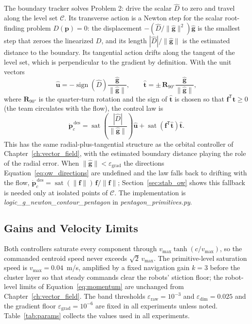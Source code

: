 \documentclass[12pt, letterpaper, oneside]{report}
\begin{document}
The boundary tracker solves Problem 2: drive the scalar $\hat D$ to zero
and travel along the level set $\mathcal{C}$. Its transverse action is a
Newton step for the scalar root-finding problem $D(\mathbf{p})=0$: the
displacement $-(\hat D/\lVert\hat{\mathbf{g}}\rVert^2)\hat{\mathbf{g}}$ is
the smallest step that zeroes the linearized $D$, and its length
$|\hat D|/\lVert\hat{\mathbf{g}}\rVert$ is the estimated distance to the
boundary. Its tangential action drifts along the tangent of the level set,
which is perpendicular to the gradient by definition. With the unit
vectors
\begin{equation}
\hat{\mathbf{u}} = -\operatorname{sign}(\hat D)\frac{\hat{\mathbf{g}}}{\lVert\hat{\mathbf{g}}\rVert},
\qquad
\hat{\mathbf{t}} = \pm\,\mathbf{R}_{90°}\frac{\hat{\mathbf{g}}}{\lVert\hat{\mathbf{g}}\rVert},
\label{eq:ow_directions}
\end{equation}
where $\mathbf{R}_{90°}$ is the quarter-turn rotation and the sign of
$\hat{\mathbf{t}}$ is chosen so that $\mathbf{f}^{\mathsf T}\hat{\mathbf{t}}\geq0$
(the team circulates with the flow), the control law is
\begin{equation}
\dot{\mathbf{p}}_c^{\,\text{des}} = \operatorname{sat}\!\left(\frac{|\hat D|}{\lVert\hat{\mathbf{g}}\rVert}\right)\hat{\mathbf{u}} + \operatorname{sat}\!\left(\mathbf{f}^{\mathsf T}\hat{\mathbf{t}}\right)\hat{\mathbf{t}}.
\label{eq:ow_law}
\end{equation}
This has the same radial-plus-tangential structure as the orbital
controller of Chapter~\ref{ch:vector_field}, with the estimated boundary
distance playing the role of the radial error. When
$\lVert\hat{\mathbf{g}}\rVert < \varepsilon_{\text{grad}}$ the directions
Equation~\eqref{eq:ow_directions} are undefined and the law falls back to
drifting with the flow,
$\dot{\mathbf{p}}_c^{\,\text{des}} = \operatorname{sat}(\lVert\mathbf{f}\rVert)\,\mathbf{f}/\lVert\mathbf{f}\rVert$;
Section~\ref{sec:stab_ow} shows this fallback is needed only at isolated
points of $\mathcal{C}$. The implementation is
\textit{logic\_g\_newton\_contour\_pentagon} in
\textit{pentagon\_primitives.py}.

\subsection{Gains and Velocity Limits}

Both controllers saturate every component through
$v_{\max}\tanh(c/v_{\max})$, so the commanded centroid speed never
exceeds $\sqrt2\,v_{\max}$. The primitive-level saturation speed is
$v_{\max}=0.04$~m/s, amplified by a fixed navigation gain $k=3$ before the
cluster layer so that steady commands clear the robots' stiction floor;
the robot-level limits of Equation~\eqref{eq:momentum} are unchanged from
Chapter~\ref{ch:vector_field}. The band thresholds
$\varepsilon_{\text{raw}}=10^{-3}$ and $\varepsilon_{\text{dim}}=0.025$ and
the gradient floor $\varepsilon_{\text{grad}}=10^{-6}$ are fixed in all
experiments unless noted. Table~\ref{tab:params} collects the values used
in all experiments.
\end{document}

